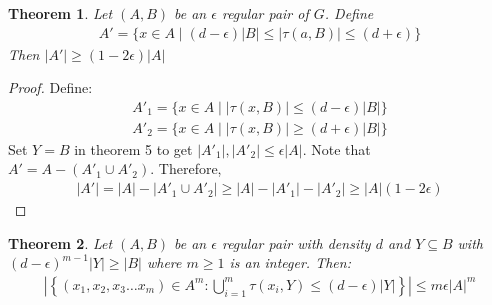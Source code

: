 \documentclass{article}
\newtheorem{theorem}{Theorem}[]
\begin{document}
\begin{theorem}
	Let $(A,B)$ be an $\epsilon$ regular pair of $G$. Define
	\begin{align}A'=\{x\in A\mid (d-\epsilon)|B|\leq  |\tau(a,B)|\leq (d+\epsilon)\}\end{align}
	Then $|A'|\geq  (1-2\epsilon)|A|$
\end{theorem}
\begin{proof}
	Define:
	\begin{align}
		A'_1=\{x\in A\mid|\tau(x,B)|\leq  (d-\epsilon)|B|\}\\
		A'_2=\{x\in A\mid|\tau(x,B)|\geq  (d+\epsilon)|B|\}
	\end{align}
	Set $Y=B$ in theorem 5 to get $|A'_1|,|A'_2|\leq  \epsilon |A|$. Note that $A'=A-(A'_1\cup A'_2)$. Therefore,
	\begin{align}
		|A'|=|A|-|A'_1\cup A'_2|\geq  |A|-|A'_1|-|A'_2|\geq  |A|(1-2\epsilon)
	\end{align} 
\end{proof}

































\begin{theorem}
	Let $(A,B)$ be an $\epsilon$ regular pair with density $d$ and $Y\subseteq B$ with $(d-\epsilon)^{m-1}|Y|\geq  |B|$ where $m\geq  1$ is an integer. Then:
	\begin{align}\left|\left\{(x_1,x_2,x_3\hdots x_m)\in A^m:\bigcup_{i=1}^m\tau(x_i,Y)\leq (d-\epsilon)|Y|\right\}\right|\leq  m\epsilon|A|^m\end{align}
\end{theorem}
\end{document}

